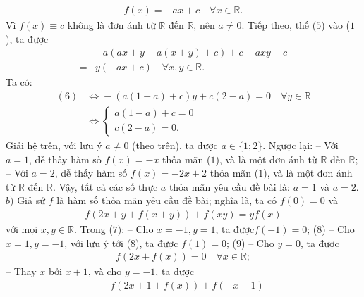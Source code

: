 \begin{multicols}{2}
	\begin{align*}
		f\left( x \right) =  - ax + c \quad \forall x \in \mathbb{R}. \tag{$5$}
	\end{align*}
	Vì  $f(x) \equiv c$ không là đơn ánh từ  $\mathbb{R}$ đến  $\mathbb{R}$, nên $a \ne 0$.
	\vskip 0.05cm
	Tiếp theo, thế ($5$) vào ($1$), ta được
	\begin{align*}
		&- a\left( {ax + y - a\left( {x + y} \right) + c} \right) + c - axy + c \\
		= &y\left( { - ax + c} \right) \quad \forall x,y \in \mathbb{R}. \tag{$6$}
	\end{align*}
	Ta có:
	\begin{align*}
		(6) \!&\Leftrightarrow  \!-\! \left(\! {a\left(\! {1 \!-\! a}\! \right) \!+\! c} \!\right)\!y \!+\! c\!\left( {2 \!-\! a} \!\right) \!=\! 0 \quad\!\!\! \forall y \!\in\! \mathbb{R}\\
		&\Leftrightarrow \begin{cases}
			a(1-a) + c = 0\\
			c(2-a) = 0.
		\end{cases}
	\end{align*}  
	Giải hệ trên, với lưu ý $a \ne 0$ (theo trên), ta được $a \in \{1; 2\}$.
	\vskip 0.05cm
	Ngược lại:
	-- Với $a = 1$, dễ thấy hàm số $f(x) = -x$ thỏa mãn ($1$), và là một đơn ánh từ  $\mathbb{R}$ đến  $\mathbb{R}$;
	\vskip 0.05cm
	-- Với $a = 2$, dễ thấy hàm số  $f(x) = -2x + 2$ thỏa mãn ($1$), và là một đơn ánh từ $\mathbb{R}$ đến $\mathbb{R}$.
	\vskip 0.05cm
	Vậy, tất cả các số thực $a$ thỏa mãn yêu cầu đề bài là: $a = 1$ và $a = 2$.
	\vskip 0.05cm
	$b)$ Giả sử $f$ là hàm số thỏa mãn yêu cầu đề bài; nghĩa là, ta có $f(0) = 0$ và
	\begin{align*}
		f\left( {2x \!+\! y \!+\! f\left( {x \!+\! y} \right)} \right) \!+\! f\left( {xy} \right) \!=\! yf\left( x \right) \tag{$7$}
	\end{align*}
	với mọi $x,y \in \mathbb{R}$.
	\vskip 0.05cm
	Trong ($7$):
	\vskip 0.05cm
	-- Cho $x = -1, y = 1$, ta được\linebreak $f(-1) = 0$; \hfill ($8$)
	\vskip 0.05cm
	-- Cho $x = 1, y = -1$, với lưu ý tới ($8$), ta được  $f(1) = 0 $; \hfill ($9$)
	\vskip 0.05cm
	-- Cho $y = 0$, ta được
	\begin{align*}
		f\left( {2x + f\left( x \right)} \right) = 0 \quad \forall x \in \mathbb{R}; \tag{$10$}
	\end{align*}
	-- Thay $x$ bởi $x + 1$, và cho $y = -1$, ta được
	\begin{align*}
		&f\left( {2x + 1 + f\left( x \right)} \right) + f\left( { - x - 1} \right)\\ 

\end{align*}
\end{multicols}
